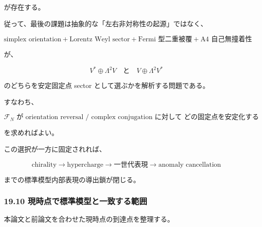 \documentclass[
  a4paper,
]{ltjsarticle}
\begin{document}
が存在する。

従って、最後の課題は抽象的な「左右非対称性の起源」ではなく、

\[
\boxed{
\text{simplex orientation}
+
\text{Lorentz Weyl sector}
+
\text{Fermi 型二重被覆}
+
\text{A4 自己無撞着性}
}
\tag{143}
\]

が、

\[
\boxed{
V^*\oplus\Lambda^2V
}
\quad\text{と}\quad
\boxed{
V\oplus\Lambda^2V^*
}
\tag{144}
\]

のどちらを安定固定点 sector として選ぶかを解析する問題である。

すなわち、

\[
\boxed{
\mathcal F_N
\text{ が orientation reversal / complex conjugation に対して
どの固定点を安定化するか}
}
\tag{145}
\]

を求めればよい。

この選択が一方に固定されれば、

\[
\boxed{
\text{chirality}
\to
\text{hypercharge}
\to
\text{一世代表現}
\to
\text{anomaly cancellation}
}
\]

までの標準模型内部表現の導出鎖が閉じる。

\subsubsection{19.10
現時点で標準模型と一致する範囲}\label{ux73feux6642ux70b9ux3067ux6a19ux6e96ux6a21ux578bux3068ux4e00ux81f4ux3059ux308bux7bc4ux56f2}

本論文と前論文を合わせた現時点の到達点を整理する。
\end{document}

